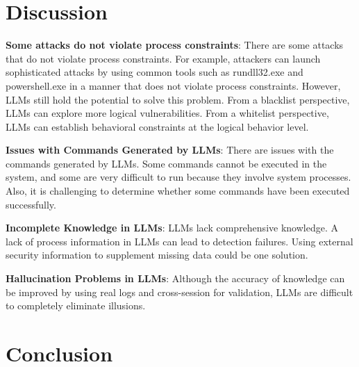 
\section{Discussion}

\textbf{Some attacks do not violate process constraints}: There are some attacks that do not violate process constraints. For example, attackers can launch sophisticated attacks by using common tools such as rundll32.exe and powershell.exe in a manner that does not violate process constraints. However, LLMs still hold the potential to solve this problem. From a blacklist perspective, LLMs can explore more logical vulnerabilities. From a whitelist perspective, LLMs can establish behavioral constraints at the logical behavior level.

\textbf{Issues with Commands Generated by LLMs}: There are issues with the commands generated by LLMs. Some commands cannot be executed in the system, and some are very difficult to run because they involve system processes. Also, it is challenging to determine whether some commands have been executed successfully.

\textbf{Incomplete Knowledge in LLMs}: LLMs lack comprehensive knowledge. A lack of process information in LLMs can lead to detection failures. Using external security information to supplement missing data could be one solution.

\textbf{Hallucination Problems in LLMs}: Although the accuracy of knowledge can be improved by using real logs and cross-session for validation, LLMs are difficult to completely eliminate illusions.

\section{Conclusion}